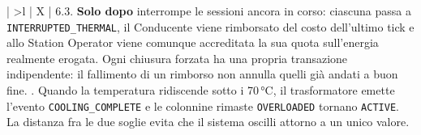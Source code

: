 \begin{xltabular}{\textwidth}{| >{\bfseries}l | X |}
6.3. \textbf{Solo dopo} interrompe le sessioni ancora in corso: ciascuna passa a \texttt{INTERRUPTED\_THERMAL}, il Conducente viene rimborsato del costo dell'ultimo tick e allo Station Operator viene comunque accreditata la sua quota sull'energia realmente erogata. Ogni chiusura forzata ha una propria transazione indipendente: il fallimento di un rimborso non annulla quelli già andati a buon fine. . Quando la temperatura ridiscende sotto i 70\,°C, il trasformatore emette l'evento \texttt{COOLING\_COMPLETE} e le colonnine rimaste \texttt{OVERLOADED} tornano \texttt{ACTIVE}. La distanza fra le due soglie evita che il sistema oscilli attorno a un unico valore. \\ \hline

\end{xltabular}
